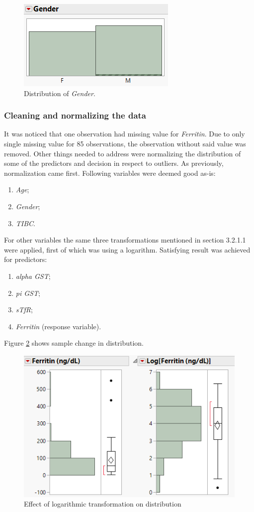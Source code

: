 	\begin{figure}[!ht]
		\centering
		\includegraphics[width=0.6\linewidth]{Rozdzial3/mnf}
		\caption{Distribution of \textit{Gender}.}
		\label{fig:mnf}
	\end{figure}
	
	\subsubsection{Cleaning and normalizing the data}
	
	It was noticed that one observation had missing value for \textit{Ferritin}. Due to only single missing value for 85 observations, the observation without said value was removed. Other things needed to address were normalizing the distribution of some of the predictors and decision in respect to outliers. As previously, normalization came first. Following variables were deemed good as-is:
	
	\begin{enumerate}
		\item \textit{Age};
		\item \textit{Gender};
		\item \textit{TIBC}.
	\end{enumerate}

	\newpage
	For other variables the same three transformations mentioned in section 3.2.1.1 were applied, first of which was using a logarithm. Satisfying result was achieved for predictors:

	\begin{enumerate}
		\item \textit{alpha GST};
		\item \textit{pi GST};
		\item \textit{sTfR};
		\item \textit{Ferritin} (response variable).
	\end{enumerate}

	Figure \ref{fig:log2} shows sample change in distribution.
	
	\begin{figure}[!ht]
		\centering
		\includegraphics[width=0.5\linewidth]{Rozdzial3/log2}
		\caption{Effect of logarithmic transformation on distribution}
		\label{fig:log2}
	\end{figure}

